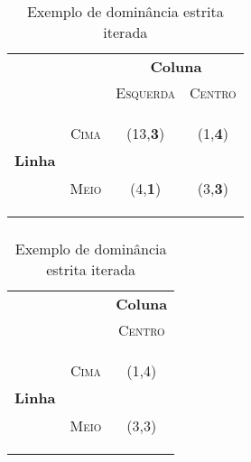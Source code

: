 \begin{frame}
\frametitle{\subsubsecname}
\begin{table}[ht]
\centering
\begin{tabular}{|c|c|c|c|}
\cline{3-4}
\multicolumn{1}{c}{} &  & \multicolumn{2}{c|}{\textbf{Coluna}}\tabularnewline
\cline{3-4}
\multicolumn{1}{c}{} &  & \textsc{Esquerda} & \textsc{Centro}\tabularnewline
\hline
\multirow{2}{*}{\begin{turn}{90}
\textbf{Linha}
\end{turn}} & \begin{turn}{90}
\textsc{Cima}
\end{turn} & {\Large(13,\textbf{3})} & {\Large(1,\textbf{4})} \tabularnewline
\cline{2-4}
 & \begin{turn}{90}
\textsc{Meio}
\end{turn} & {\Large(4,\textbf{1})} & {\Large(3,\textbf{3})} \tabularnewline
\hline
\end{tabular}
\caption{Exemplo de dominância estrita iterada}
\label{tab:dominancia-estrita-iterada}
\end{table}
\end{frame}

\begin{frame}
\frametitle{\subsubsecname}
\begin{table}[ht]
\centering
\begin{tabular}{|c|c|c|}
\cline{3-3}
\multicolumn{1}{c}{} &  & \multicolumn{1}{c|}{\textbf{Coluna}}\tabularnewline
\cline{3-3}
\multicolumn{1}{c}{} &  &  \textsc{Centro}\tabularnewline
\hline
\multirow{2}{*}{\begin{turn}{90}
\textbf{Linha}
\end{turn}} & \begin{turn}{90}
\textsc{Cima}
\end{turn} & {\Large(1,4)} \tabularnewline
\cline{2-3}
 & \begin{turn}{90}
\textsc{Meio}
\end{turn} & {\Large(3,3)} \tabularnewline
\hline
\end{tabular}
\caption{Exemplo de dominância estrita iterada}
\label{tab:dominancia-estrita-iterada}
\end{table}
\end{frame}

